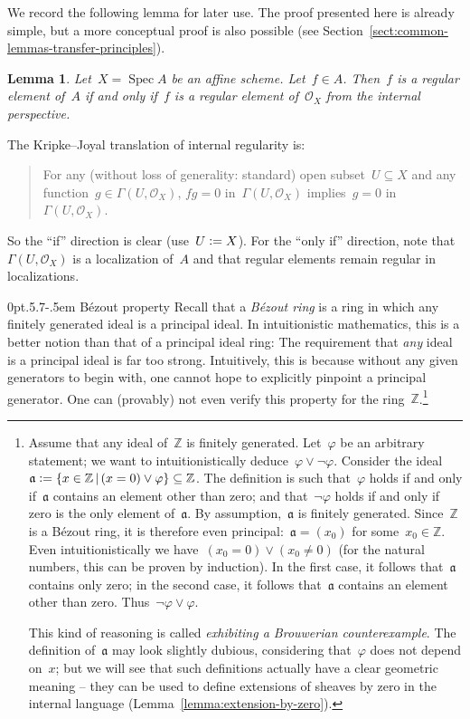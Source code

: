 \documentclass[10pt,reqno,a4paper]{amsbook}
\makeatletter
\theoremstyle{definition}
\theoremstyle{plain}
\newtheorem{lemma}[defn]{Lemma}
\theoremstyle{remark}
\newcommand{\ZZ}{\mathbb{Z}}
\renewcommand{\O}{\mathcal{O}}
\newcommand{\aaa}{\mathfrak{a}}
\DeclareMathOperator{\Spec}{Spec}
\newcommand{\?}{\,{:}\,}
\renewcommand{\_}{\mathpunct{.}\,}
\newcommand{\defeq}{\vcentcolon=}
\renewenvironment{proof}[1][\proofname]{\par
  \pushQED{\qed}%
  \normalfont \topsep6\p@\@plus6\p@\relax
  \trivlist
  \item[\hskip\labelsep
        \itshape
    #1\@addpunct{.}]\ignorespaces
}{%
  \popQED\endtrivlist\@endpefalse
}
\def\subsection{\@startsection{subsection}{2}%
  {0pt}{.5\linespacing\@plus.7\linespacing}{-.5em}%
  {\normalfont\bfseries}}
\makeatother
\begin{document}
We record the following lemma for later use. The proof presented here is
already simple, but a more conceptual proof is also possible (see
Section~\ref{sect:common-lemmas-transfer-principles}).
\begin{lemma}\label{lemma:regular-affine}
Let~$X = \Spec A$ be an affine scheme. Let~$f \in A$. Then~$f$ is
a regular element of~$A$ if and only if~$f$ is a regular element of~$\O_X$ from
the internal perspective.\end{lemma}
\begin{proof}The Kripke--Joyal translation of internal regularity is:
\begin{quote}For any (without loss of generality: standard) open subset~$U \subseteq X$ and any function~$g \in
\Gamma(U,\O_X)$, $fg = 0$ in~$\Gamma(U,\O_X)$ implies~$g = 0$
in~$\Gamma(U,\O_X)$.\end{quote}
So the ``if'' direction is clear (use~$U \defeq X$). For the ``only if'' direction,
note that~$\Gamma(U,\O_X)$ is a localization of~$A$ and that regular elements
remain regular in localizations.
\end{proof}


\subsection{Bézout property} Recall that a \emph{Bézout ring} is a ring in
which any finitely generated ideal is a principal ideal. In intuitionistic
mathematics, this is a better notion than that of a principal ideal ring: The
requirement that \emph{any} ideal is a principal ideal is far too strong.
Intuitively, this is because without any given generators to begin with, one
cannot hope to explicitly pinpoint a principal generator.
One can (provably) not even verify this property for the ring~$\ZZ$.\footnote{\label{fn:z-principal-ideal-domain}Assume
that any ideal of~$\ZZ$ is finitely generated. Let~$\varphi$ be an arbitrary
statement; we want to intuitionistically deduce~$\varphi \vee \neg\varphi$.
Consider the ideal~$\aaa \defeq \{ x \in \ZZ \,|\, (x = 0) \vee \varphi \}
\subseteq \ZZ$. The definition is such that~$\varphi$ holds if and only
if~$\aaa$ contains an element other than zero; and that~$\neg\varphi$ holds if
and only if zero is the only element of~$\aaa$.
By assumption,~$\aaa$ is finitely generated. Since~$\ZZ$ is a
Bézout ring, it is therefore even principal:~$\aaa = (x_0)$ for some~$x_0 \in
\ZZ$. Even intuitionistically we have~$(x_0 = 0) \vee (x_0 \neq 0)$ (for the
natural numbers, this can be proven by induction). In the first case, it
follows that~$\aaa$ contains only zero; in the second case, it follows
that~$\aaa$ contains an element other than zero. Thus~$\neg\varphi \vee
\varphi$.

This kind of reasoning is called \emph{exhibiting a Brouwerian
counterexample}. The definition of~$\aaa$ may look slightly dubious,
considering that~$\varphi$ does not depend on~$x$; but we will see that such
definitions actually have a clear geometric meaning -- they can be used to
define extensions of sheaves by zero in the internal language
(Lemma~\ref{lemma:extension-by-zero}).}
\end{document}
